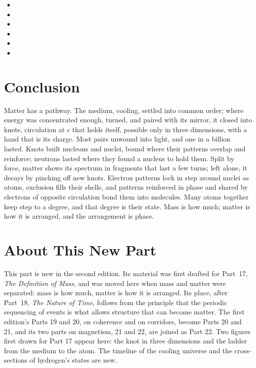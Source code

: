 \documentclass[11pt,a4paper]{article}
\begin{document}
\begin{itemize}
\item {}
\item {}
\item {}
\item {}
\item {}
\item {}
\end{itemize}

\section*{Conclusion}

Matter has a pathway. The medium, cooling, settled into common order; where energy was concentrated enough, turned, and paired with its mirror, it closed into knots, circulation at $c$ that holds itself, possible only in three dimensions, with a hand that is its charge. Most pairs unwound into light, and one in a billion lasted. Knots built nucleons and nuclei, bound where their patterns overlap and reinforce; neutrons lasted where they found a nucleus to hold them. Split by force, matter shows its spectrum in fragments that last a few turns; left alone, it decays by pinching off new knots. Electron patterns lock in step around nuclei as atoms, exclusion fills their shells, and patterns reinforced in phase and shared by electrons of opposite circulation bond them into molecules. Many atoms together keep step to a degree, and that degree is their state. Mass is how much; matter is how it is arranged, and the arrangement is phase.

\clearpage
\section*{About This New Part}

This part is new in the second edition. Its material was first drafted for Part~17, \emph{The Definition of Mass}, and was moved here when mass and matter were separated: mass is how much, matter is how it is arranged. Its place, after Part~18, \emph{The Nature of Time}, follows from the principle that the periodic sequencing of events is what allows structure that can become matter. The first edition's Parts 19 and 20, on coherence and on corridors, become Parts 20 and 21, and its two parts on magnetism, 21 and 22, are joined as Part 22. Two figures first drawn for Part 17 appear here: the knot in three dimensions and the ladder from the medium to the atom. The timeline of the cooling universe and the cross-sections of hydrogen's states are new.

\newpage


\end{document}
